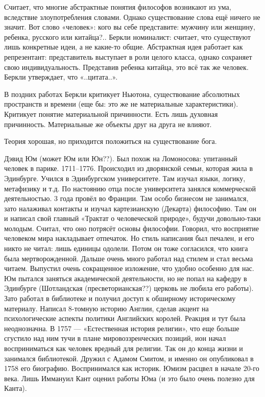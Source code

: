 Считает, что многие абстрактные понятия философов возникают из ума, вследствие злоупотребления словами. Однако существование слова ещё ничего не значит. Вот слово «человек»: кого вы себе представите: мужчину или женщину, ребенка, русского или китайца?.. 
Беркли номиналист: считает, что существуют лишь конкретные идеи, а не какие-то общие. Абстрактная идея работает как репрезентант: представитель выступает в роли целого класса, однако сохраняет свою индивидуальность. Представив ребенка китайца, это всё так же человек.
Беркли утверждает, что «..цитата..».

В поздних работах Беркли критикует Ньютона, существование абсолютных пространств и времени (еще бы: это же не материальные характеристики).  Критикует понятие материальной причинности. Есть лишь духовная причинность. Материальные же объекты друг на друга не влияют. 

Теория хорошая, но приходится положиться на существование бога.

Дэвид Юм (может Юм или Юн??). Был похож на Ломоносова: упитанный человек в парике. 1711--1776. 
Происходил из дворянской семьи, которая жила в Эдинбурге. Учился в Эдинбургском университете. Там изучал языки, логику, метафизику и т.д. По настоянию отца после университета занялся коммерческой деятельностью. 
3 года провёл во Франции. Там особо бизнесом не занимался, зато налаживал контакты и изучал картезианскую (Декарта) философию. 
Там он и написал свой главный «Трактат о человеческой природе», будучи довольно-таки молодым. Считал, что оно потрясёт основы философии. Говорил, что восприятие человеком мира накладывает отпечаток. Но стиль написания был печален, и его никто не читал: лишь единицы одолели. Потом он тоже согласился, что книга была мертворожденной. 
Дальше очень много работал над стилем и стал весьма читаем. Выпустил очень сокращенное изложение, что удобно особенно для нас. Юм пытался заняться академической деятельности, но не попал на кафедру в Эдинбурге (Шотландская (пресветорианская??) церковь не любила его работы). Зато работал в библиотеке и получил доступ к обширному историческому материалу. 
Написал 8-томную историю Англии, сделав акцент на психологические аспекты политики Английских королей. Реакция и тут была неоднозначна. В 1757 --- «Естественная история религии», что еще больше сгустило над ним тучи в плане мировоззренческих позиций, ион начал восприниматься как человек вредный для религии. 
Так он до конца жизни и занимался библиотекой. Дружил с Адамом Смитом, и именно он опубликовал в 1758 его биографию. Воспринимался как историк. Юмизм расцвел в начале 20-го века. Лишь Иммануил Кант оценил работы Юма (и это было очень полезно для Канта).

